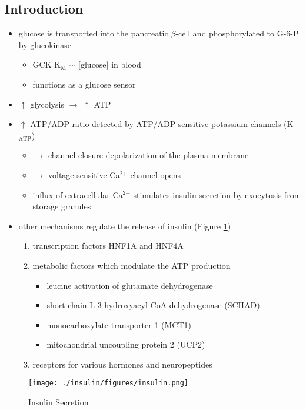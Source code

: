 \documentclass{scrartcl}
\begin{document}
\subsection{Introduction}
\label{sec:org03c83b6}
\begin{itemize}
\item glucose is transported into the pancreatic \(\beta\)-cell and phosphorylated to G-6-P by glucokinase
\begin{itemize}
\item GCK K\(_{\text{M}}\) \(\sim\) [glucose] in blood
\item functions as a glucose sensor
\end{itemize}
\item \(\uparrow\) glycolysis \(\to\) \(\uparrow\) ATP
\item \(\uparrow\) ATP/ADP ratio detected by ATP/ADP-sensitive potassium channels (K\(_{\text{ATP}}\))
\begin{itemize}
\item \(\to\) channel closure depolarization of the plasma membrane
\item \(\to\) voltage-sensitive Ca\(^{\text{2+}}\) channel opens
\item influx of extracellular Ca\(^{\text{2+}}\) stimulates insulin secretion by
exocytosis from storage granules
\end{itemize}

\item other mechanisms regulate the release of insulin (Figure \ref{fig:org34ad226})
\begin{enumerate}
\item transcription factors HNF1A and HNF4A
\item metabolic factors which modulate the ATP production
\begin{itemize}
\item leucine activation of glutamate dehydrogenase
\item short-chain L-3-hydroxyacyl-CoA dehydrogenase (SCHAD)
\item monocarboxylate transporter 1 (MCT1)
\item mitochondrial uncoupling protein 2 (UCP2)
\end{itemize}
\item receptors for various hormones and neuropeptides
\end{enumerate}
\end{itemize}



\begin{figure}[htbp]
\centering
\texttt{[image: ./insulin/figures/insulin.png]}
\caption[insulin]{\label{fig:org34ad226}
Insulin Secretion}
\end{figure}
\end{document}
